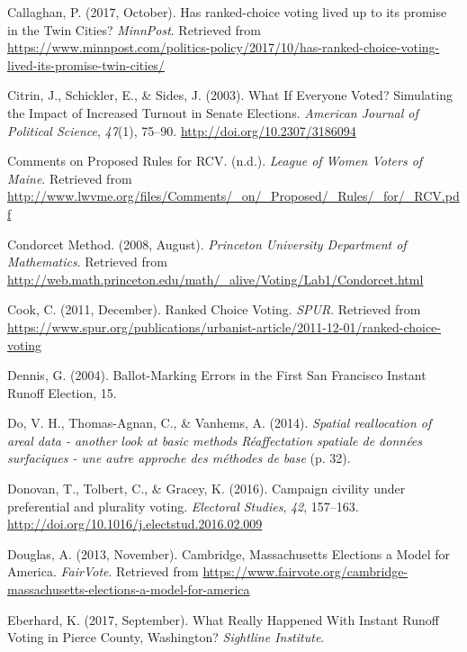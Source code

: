 \documentclass[12pt,twoside]{reedthesis}
\begin{document}
\leavevmode\hypertarget{ref-callaghan_has_2017}{}%
Callaghan, P. (2017, October). Has ranked-choice voting lived up to its promise in the Twin Cities? \emph{MinnPost}. Retrieved from \url{https://www.minnpost.com/politics-policy/2017/10/has-ranked-choice-voting-lived-its-promise-twin-cities/}

\leavevmode\hypertarget{ref-citrin_what_2003}{}%
Citrin, J., Schickler, E., \& Sides, J. (2003). What If Everyone Voted? Simulating the Impact of Increased Turnout in Senate Elections. \emph{American Journal of Political Science}, \emph{47}(1), 75--90. \url{http://doi.org/10.2307/3186094}

\leavevmode\hypertarget{ref-noauthor_comments_nodate}{}%
Comments on Proposed Rules for RCV. (n.d.). \emph{League of Women Voters of Maine}. Retrieved from \url{http://www.lwvme.org/files/Comments/_on/_Proposed/_Rules/_for/_RCV.pdf}

\leavevmode\hypertarget{ref-noauthor_condorcet_2008}{}%
Condorcet Method. (2008, August). \emph{Princeton University Department of Mathematics}. Retrieved from \url{http://web.math.princeton.edu/math/_alive/Voting/Lab1/Condorcet.html}

\leavevmode\hypertarget{ref-cook_ranked_2011}{}%
Cook, C. (2011, December). Ranked Choice Voting. \emph{SPUR}. Retrieved from \url{https://www.spur.org/publications/urbanist-article/2011-12-01/ranked-choice-voting}

\leavevmode\hypertarget{ref-dennis_ballot-marking_2004}{}%
Dennis, G. (2004). Ballot-Marking Errors in the First San Francisco Instant Runoff Election, 15.

\leavevmode\hypertarget{ref-do_spatial_2014}{}%
Do, V. H., Thomas-Agnan, C., \& Vanhems, A. (2014). \emph{Spatial reallocation of areal data - another look at basic methods Réaffectation spatiale de données surfaciques - une autre approche des méthodes de base} (p. 32).

\leavevmode\hypertarget{ref-donovan_campaign_2016}{}%
Donovan, T., Tolbert, C., \& Gracey, K. (2016). Campaign civility under preferential and plurality voting. \emph{Electoral Studies}, \emph{42}, 157--163. \url{http://doi.org/10.1016/j.electstud.2016.02.009}

\leavevmode\hypertarget{ref-douglas_cambridge_2013}{}%
Douglas, A. (2013, November). Cambridge, Massachusetts Elections a Model for America. \emph{FairVote}. Retrieved from \url{https://www.fairvote.org/cambridge-massachusetts-elections-a-model-for-america}

\leavevmode\hypertarget{ref-eberhard_what_2017}{}%
Eberhard, K. (2017, September). What Really Happened With Instant Runoff Voting in Pierce County, Washington? \emph{Sightline Institute}.
\end{document}
